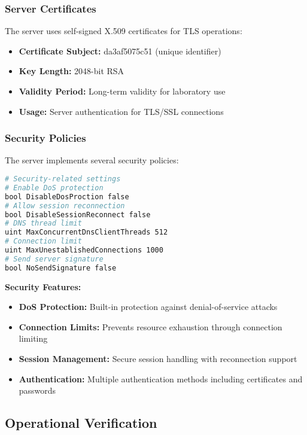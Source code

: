 \subsubsection{Server Certificates}

The server uses self-signed X.509 certificates for TLS operations:

\begin{itemize}
    \item \textbf{Certificate Subject:} da3af5075c51 (unique identifier)
    \item \textbf{Key Length:} 2048-bit RSA
    \item \textbf{Validity Period:} Long-term validity for laboratory use
    \item \textbf{Usage:} Server authentication for TLS/SSL connections
\end{itemize}

\subsubsection{Security Policies}

The server implements several security policies:

\begin{lstlisting}[language=bash]
# Security-related settings
# Enable DoS protection
bool DisableDosProction false                     
# Allow session reconnection
bool DisableSessionReconnect false               
# DNS thread limit 
uint MaxConcurrentDnsClientThreads 512           
# Connection limit
uint MaxUnestablishedConnections 1000            
# Send server signature
bool NoSendSignature false                       
\end{lstlisting}

\textbf{Security Features:}

\begin{itemize}
    \item \textbf{DoS Protection:} Built-in protection against denial-of-service attacks
    \item \textbf{Connection Limits:} Prevents resource exhaustion through connection limiting
    \item \textbf{Session Management:} Secure session handling with reconnection support
    \item \textbf{Authentication:} Multiple authentication methods including certificates and passwords
\end{itemize}

\subsection{Operational Verification}


